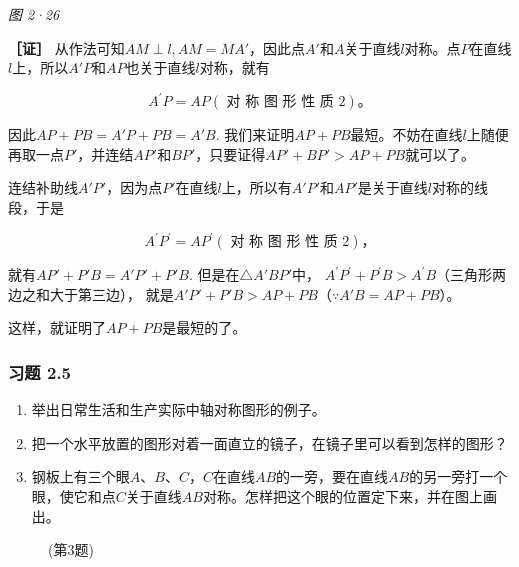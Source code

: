 \emph{图 2·26}

\textbf{［证］}
从作法可知\(AM \perp l, AM = MA'\)，因此点\(A'\)和\(A\)关于直线\(l\)对称。点\(P\)在直线\(l\)上，所以\(A'P\)和\(AP\)也关于直线\(l\)对称，就有

\[
A ^{\prime} P = AP (\text{ 对 称 图 形 性 质 } 2)\text{。}
\]

因此\(AP + PB = A'P + PB = A'B.\)
我们来证明\(AP + PB\)最短。不妨在直线\(l\)上随便再取一点\(P'\)，并连结\(AP'\)和\(BP'\)，只要证得\(AP' + BP' > AP + PB\)就可以了。

连结补助线\(A'P'\)，因为点\(P'\)在直线\(l\)上，所以有\(A'P'\)和\(AP'\)是关于直线\(l\)对称的线段，于是

\[
A ^{\prime} P ^{\prime} = AP ^{\prime} (\text{ 对 称 图 形 性 质 } 2)\text{，}
\]

就有\(AP' + P'B = A'P' + P'B.\) 但是在\(\triangle A'BP'\)中，
\(A^{\prime}P^{\prime}+P^{\prime}B>A^{\prime}B\)（三角形两边之和大于第三边），
就是\(A'P' + P'B > AP + PB\)（\(\because A'B = AP + PB\)）。

这样，就证明了\(AP + PB\)是最短的了。

\subsubsection{习题 2.5}

\begin{enumerate}
\item
  举出日常生活和生产实际中轴对称图形的例子。
\item
  把一个水平放置的图形对着一面直立的镜子，在镜子里可以看到怎样的图形？
\item
  钢板上有三个眼\(A\)、\(B\)、\(C\)，\(C\)在直线\(AB\)的一旁，要在直线\(AB\)的另一旁打一个眼，使它和点\(C\)关于直线\(AB\)对称。怎样把这个眼的位置定下来，并在图上画出。
\end{enumerate}

\begin{figure}
\centering
{}
\caption{(第3题)}
\end{figure}

